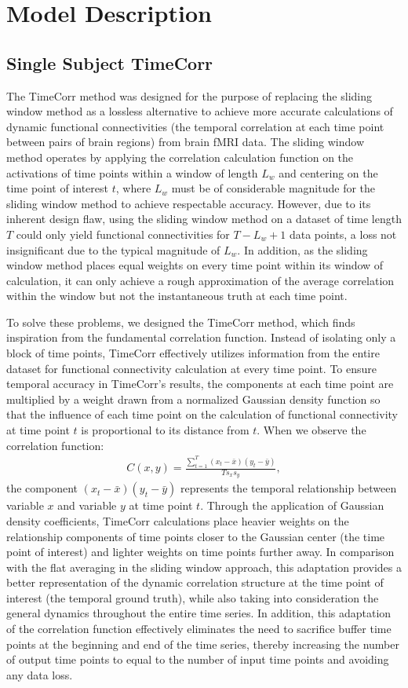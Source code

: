 \documentclass[11pt]{article}
\begin{document}
\newpage
\section{Model Description}
\subsection{Single Subject TimeCorr}
The TimeCorr method was designed for the purpose of replacing the sliding window method as a lossless alternative to achieve more accurate calculations of dynamic functional connectivities (the temporal correlation at each time point between pairs of brain regions) from brain fMRI data. The sliding window method operates by applying the correlation calculation function on the activations of time points within a window of length $L_w$ and centering on the time point of interest $t$, where $L_w$ must be of considerable magnitude for the sliding window method to achieve respectable accuracy. However, due to its inherent design flaw, using the sliding window method on a dataset of time length $T$ could only yield functional connectivities for $T-L_w+1$ data points, a loss not insignificant due to the typical magnitude of $L_w$. In addition, as the sliding window method places equal weights on every time point within its window of calculation, it can only achieve a rough approximation of the average correlation within the window but not the instantaneous truth at each time point.

To solve these problems, we designed the TimeCorr method, which finds inspiration from the fundamental correlation function. Instead of isolating only a block of time points, TimeCorr effectively utilizes information from the entire dataset for functional connectivity calculation at every time point. To ensure temporal accuracy in TimeCorr's results, the components at each time point are multiplied by a weight drawn from a normalized Gaussian density function so that the influence of each time point on the calculation of functional connectivity at time point $t$ is proportional to its distance from $t$. When we observe the correlation function:
\begin{align*}
C(x,y) = \frac{\sum_{t=1}^T (x_t-\bar{x})(y_t-\bar{y})}{Ts_xs_y},
\end{align*}
the component $(x_t-\bar{x})(y_t-\bar{y})$ represents the temporal relationship between variable $x$ and variable $y$ at time point $t$. Through the application of Gaussian density coefficients, TimeCorr calculations place heavier weights on the relationship components of time points closer to the Gaussian center (the time point of interest) and lighter weights on time points further away. In comparison with the flat averaging in the sliding window approach, this adaptation provides a better representation of the dynamic correlation structure at the time point of interest (the temporal ground truth), while also taking into consideration the general dynamics throughout the entire time series. In addition, this adaptation of the correlation function effectively eliminates the need to sacrifice buffer time points at the beginning and end of the time series, thereby increasing the number of output time points to equal to the number of input time points and avoiding any data loss.
\end{document}
